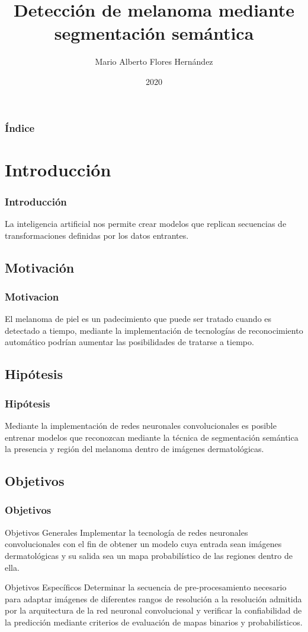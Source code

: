 \documentclass{beamer}
\title{Detección de melanoma mediante segmentación semántica}
\author{Mario Alberto Flores Hernández}
\institute{ \\Universidad Autónoma de Nuevo León \\Facultad de Ingeniería Mecánica y Eléctrica}
\date{2020}
\begin{document}
\frame{\titlepage}

\begin{frame}
    \frametitle{Índice}
        \tableofcontents
\end{frame}
\section{Introducción}
\begin{frame}
    \frametitle{Introducción}
    La inteligencia artificial nos permite crear modelos que replican secuencias de transformaciones definidas por los datos entrantes.
\end{frame}

\subsection{Motivación}
\begin{frame}
    \frametitle{Motivacion}
    El melanoma de piel es un padecimiento que puede ser tratado cuando es detectado a tiempo, mediante la implementación de tecnologías de reconocimiento automático podrían aumentar las posibilidades de tratarse a tiempo.
\end{frame}

\subsection{Hipótesis}
\begin{frame}
    \frametitle{Hipótesis}
    Mediante la implementación de redes neuronales convolucionales es posible entrenar modelos que reconozcan mediante la técnica de segmentación semántica la presencia y región del melanoma dentro de imágenes dermatológicas.
\end{frame}

\subsection{Objetivos}
\begin{frame}
    \frametitle{Objetivos}
    \begin{block}{Objetivos Generales}
        Implementar la tecnología de redes neuronales convolucionales con el fin de obtener un modelo cuya entrada sean imágenes dermatológicas y su salida sea un mapa probabilístico de las regiones dentro de ella.
        
    \end{block}
    \begin{block}{Objetivos Específicos}
        Determinar la secuencia de pre-procesamiento necesario para adaptar imágenes de diferentes rangos de resolución a la resolución admitida por la arquitectura de la red neuronal convolucional y verificar la confiabilidad de la predicción mediante criterios de evaluación de mapas binarios y probabilísticos.
        
    \end{block}
\end{frame}
\end{document}
